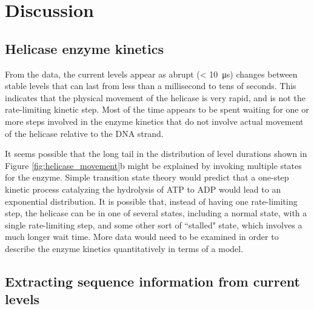 \section{Discussion}

\subsection{Helicase enzyme kinetics}

From the data, the current levels appear as abrupt (< \SI{10}{\micro\s}) changes between stable levels that can last from less than a millisecond to tens of seconds.  This indicates that the physical movement of the helicase is very rapid, and is not the rate-limiting kinetic step.  Most of the time appears to be spent waiting for one or more steps involved in the enzyme kinetics that do not involve actual movement of the helicase relative to the DNA strand.

It seems possible that the long tail in the distribution of level durations shown in Figure \ref{fig:helicase_movement}b might be explained by invoking multiple states for the enzyme.  Simple transition state theory would predict that a one-step kinetic process catalyzing the hydrolysis of ATP to ADP would lead to an exponential distribution.  It is possible that, instead of having one rate-limiting step, the helicase can be in one of several states, including a normal state, with a single rate-limiting step, and some other sort of ``stalled" state, which involves a much longer wait time.  More data would need to be examined in order to describe the enzyme kinetics quantitatively in terms of a model.

\subsection{Extracting sequence information from current levels}


